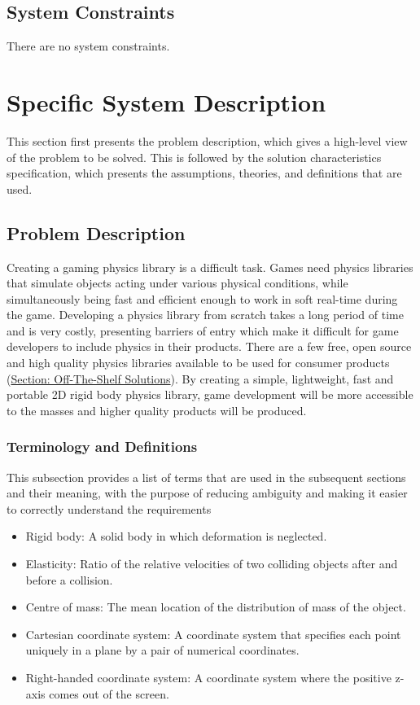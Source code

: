 \documentclass[12pt]{article}
\begin{document}
\subsection{System Constraints}
\label{Sec:SysConstraints}
There are no system constraints.
\section{Specific System Description}
\label{Sec:SpecSystDesc}
This section first presents the problem description, which gives a high-level view of the problem to be solved. This is followed by the solution characteristics specification, which presents the assumptions, theories, and definitions that are used.
\subsection{Problem Description}
\label{Sec:ProbDesc}
Creating a gaming physics library is a difficult task. Games need physics libraries that simulate objects acting under various physical conditions, while simultaneously being fast and efficient enough to work in soft real-time during the game. Developing a physics library from scratch takes a long period of time and is very costly, presenting barriers of entry which make it difficult for game developers to include physics in their products. There are a few free, open source and high quality physics libraries available to be used for consumer products (\hyperref[Sec:ExistingSolns]{Section: Off-The-Shelf Solutions}). By creating a simple, lightweight, fast and portable 2D rigid body physics library, game development will be more accessible to the masses and higher quality products will be produced.
\subsubsection{Terminology and Definitions}
\label{Sec:TermDefs}
This subsection provides a list of terms that are used in the subsequent sections and their meaning, with the purpose of reducing ambiguity and making it easier to correctly understand the requirements
\begin{itemize}
\item{Rigid body: A solid body in which deformation is neglected.}
\item{Elasticity: Ratio of the relative velocities of two colliding objects after and before a collision.}
\item{Centre of mass: The mean location of the distribution of mass of the object.}
\item{Cartesian coordinate system: A coordinate system that specifies each point uniquely in a plane by a pair of numerical coordinates.}
\item{Right-handed coordinate system: A coordinate system where the positive z-axis comes out of the screen.}
\end{itemize}
\end{document}

